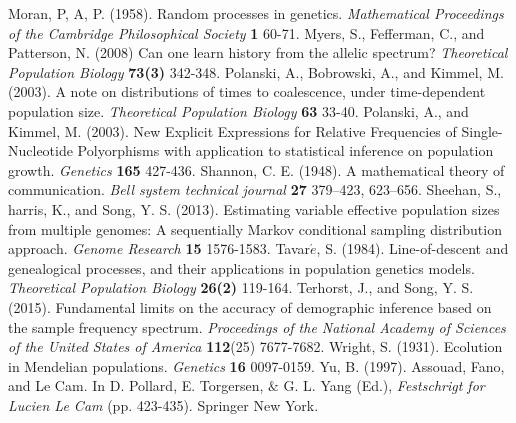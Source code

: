 \documentclass[12pt, a4paper,twoside]{report}
\theoremstyle{definition}
\theoremstyle{myplain}
\theoremstyle{mypro}
\begin{document}
\begin{thebibliography}{10}
Moran, P, A, P. (1958). Random processes in genetics. \textit{Mathematical Proceedings of the Cambridge Philosophical Society} \textbf{1} 60-71.
Myers, S., Fefferman, C., and Patterson, N. (2008) Can one learn history from the allelic spectrum? \textit{Theoretical Population Biology} \textbf{73(3)} 342-348.
Polanski, A., Bobrowski, A., and Kimmel, M. (2003). A note on distributions of times to coalescence, under time-dependent population size. \textit{Theoretical Population Biology} \textbf{63} 33-40.
Polanski, A., and Kimmel, M. (2003). New Explicit Expressions for Relative Frequencies of Single-Nucleotide Polyorphisms with application to statistical inference on population growth. \textit{Genetics} \textbf{165} 427-436.
Shannon, C. E. (1948). A mathematical theory of communication. \textit{Bell system technical journal} \textbf{27} 379–423, 623–656.
Sheehan, S., harris, K., and Song, Y. S. (2013). Estimating variable effective population sizes from multiple genomes: A sequentially Markov conditional sampling distribution approach. \textit{Genome Research} \textbf{15} 1576-1583.
Tavar$\acute{e}$, S. (1984). Line-of-descent and genealogical processes, and their applications in population genetics models. \textit{Theoretical Population Biology} \textbf{26(2)} 119-164.
Terhorst, J., and Song, Y. S. (2015). Fundamental limits on the accuracy of demographic inference based on the sample frequency spectrum. \textit{Proceedings of the National Academy of Sciences of the United States of America} \textbf{112}(25) 7677-7682.
Wright, S. (1931). Ecolution in Mendelian populations. \textit{Genetics} \textbf{16} 0097-0159.
Yu, B. (1997). Assouad, Fano, and Le Cam. In D. Pollard, E. Torgersen, $\&$ G. L. Yang (Ed.), \textit{Festschrigt for Lucien Le  Cam} (pp. 423-435). Springer New York.
\end{thebibliography} 
\end{document}
